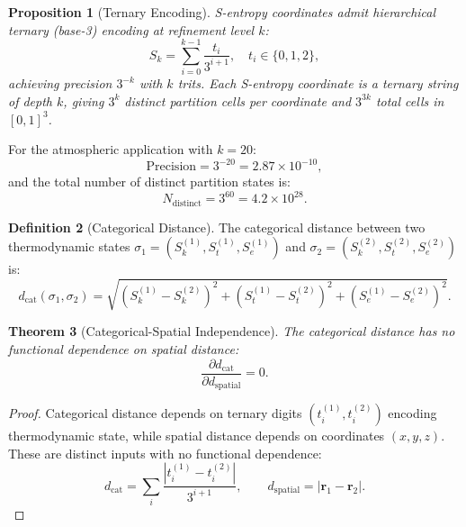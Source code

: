 \documentclass[twocolumn,10pt]{article}
\newtheorem{theorem}{Theorem}[section]
\newtheorem{proposition}[theorem]{Proposition}
\theoremstyle{definition}
\newtheorem{definition}[theorem]{Definition}
\newcommand{\dcat}{d_{\mathrm{cat}}}
\newcommand{\Sk}{S_k}
\newcommand{\St}{S_t}
\newcommand{\Se}{S_e}
\begin{document}
\begin{proposition}[Ternary Encoding]\label{prop:ternary}
S-entropy coordinates admit hierarchical ternary (base-3) encoding at refinement level $k$:
\begin{equation}\label{eq:ternary}
    \Sk = \sum_{i=0}^{k-1} \frac{t_i}{3^{i+1}}, \quad t_i \in \{0, 1, 2\},
\end{equation}
achieving precision $3^{-k}$ with $k$ trits. Each S-entropy coordinate is a ternary string of depth $k$, giving $3^k$ distinct partition cells per coordinate and $3^{3k}$ total cells in $[0,1]^3$.
\end{proposition}

For the atmospheric application with $k = 20$:
\begin{equation}\label{eq:precision_20}
    \text{Precision} = 3^{-20} = 2.87 \times 10^{-10},
\end{equation}
and the total number of distinct partition states is:
\begin{equation}\label{eq:total_states}
    N_{\mathrm{distinct}} = 3^{60} = 4.2 \times 10^{28}.
\end{equation}

\begin{definition}[Categorical Distance]\label{def:cat_distance}
The categorical distance between two thermodynamic states $\sigma_1 = (\Sk^{(1)}, \St^{(1)}, \Se^{(1)})$ and $\sigma_2 = (\Sk^{(2)}, \St^{(2)}, \Se^{(2)})$ is:
\begin{equation}\label{eq:cat_distance}
    \dcat(\sigma_1, \sigma_2) = \sqrt{(\Sk^{(1)} - \Sk^{(2)})^2 + (\St^{(1)} - \St^{(2)})^2 + (\Se^{(1)} - \Se^{(2)})^2}.
\end{equation}
\end{definition}

\begin{theorem}[Categorical-Spatial Independence]\label{thm:cat_spatial_indep}
The categorical distance has no functional dependence on spatial distance:
\begin{equation}\label{eq:cat_spatial_indep}
    \frac{\partial \dcat}{\partial d_{\mathrm{spatial}}} = 0.
\end{equation}
\end{theorem}

\begin{proof}
Categorical distance depends on ternary digits $(t_i^{(1)}, t_i^{(2)})$ encoding thermodynamic state, while spatial distance depends on coordinates $(x, y, z)$. These are distinct inputs with no functional dependence:
\begin{equation}
    \dcat = \sum_i \frac{|t_i^{(1)} - t_i^{(2)}|}{3^{i+1}}, \qquad d_{\mathrm{spatial}} = |\mathbf{r}_1 - \mathbf{r}_2|.
\end{equation}
\end{proof}
\end{document}

